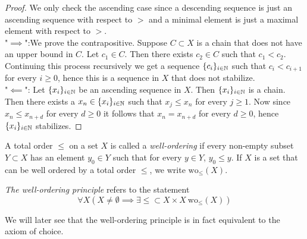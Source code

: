 \begin{proof}
    We only check the ascending case since a descending sequence is just an ascending sequence with respect to $>$ and a minimal element is just a maximal element with respect to $>$.\\
    "$\implies$":We prove the contrapositive. Suppose $C\subset X$ is a chain that does not have an upper bound in $C$. Let $c_1\in C$. Then there exists $c_2 \in C$ such that $c_1 < c_2$. Continuing this process recursively we get a sequence $\{c_i\}_{i\in \mathbb{N}}$ such that $c_i<c_{i+1}$ for every $i\geq 0$, hence this is a sequence in $X$ that does not stabilize.\\
    "$\impliedby$": Let $\{x_i\}_{i\in \mathbb{N}}$ be an ascending sequence in $X$. Then $\{x_i\}_{i\in \mathbb{N}}$ is a chain. Then there exists a $x_n\in \{x_i\}_{i\in \mathbb{N}}$ such that $x_j\leq x_n$ for every $j\geq 1$. Now since $x_n \leq x_{n+d}$ for every $d\geq 0$ it follows that $x_n=x_{n+d}$ for every $d\geq0$, hence $\{x_i\}_{i\in \mathbb{N}}$ stabilizes. 
\end{proof}
\begin{definition}
    A total order $\leq$ on a set $X$ is called a \textit{well-ordering} if every non-empty subset $Y\subset X$ has an element $y_0\in Y$ such that for every $y\in Y$, $y_0\leq y$. If $X$ is a set that can be well ordered by a total order $\leq$, we write $\mathrm{wo}_\leq(X)$. 
\end{definition}
\begin{definition}
    \textit{The well-ordering principle} refers to the statement
    $$\forall X(X \neq \emptyset \implies \exists \leq\subset X\times X\ \mathrm{wo}_\leq(X))$$ 
\end{definition}
We will later see that the well-ordering principle is in fact equivalent to the axiom of choice.  
